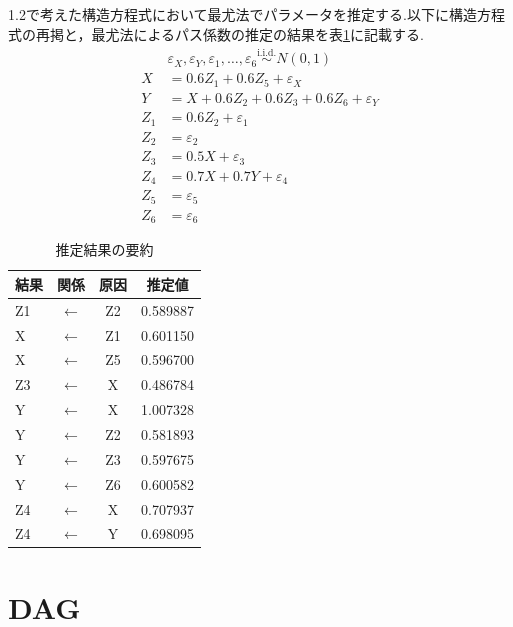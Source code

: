 \documentclass[uplatex, dvipdfmx]{jsarticle}
\begin{document}
\begin{exm}{}
  1.2で考えた構造方程式において最尤法でパラメータを推定する.以下に構造方程式の再掲と，最尤法によるパス係数の推定の結果を表\ref{tab:results_2}に記載する.
  \begin{align}
      &\varepsilon_X, \varepsilon_Y, \varepsilon_1, \dots, \varepsilon_6 \overset{\text{i.i.d.}}{\sim} N(0, 1) \\
      X  &= 0.6Z_1 + 0.6Z_5 + \varepsilon_X \\
      Y  &= X + 0.6Z_2 + 0.6Z_3 + 0.6Z_6 + \varepsilon_Y \\
      Z_1 &= 0.6Z_2 + \varepsilon_1 \\
      Z_2 &= \varepsilon_2 \\
      Z_3 &= 0.5X + \varepsilon_3 \\
      Z_4 &= 0.7X + 0.7Y + \varepsilon_4 \\
      Z_5 &= \varepsilon_5 \\
      Z_6 &= \varepsilon_6 
  \end{align}

  \begin{table}[H]
    \centering
    \caption{推定結果の要約}
    \label{tab:results_2}
    \begin{tabular}{lccc}
      \hline
      結果 & 関係 & 原因 & 推定値 \\ \hline
      Z1 & $\leftarrow$ & Z2 & 0.589887 \\
      X & $\leftarrow$ & Z1 & 0.601150 \\
      X & $\leftarrow$ & Z5 & 0.596700 \\
      Z3 & $\leftarrow$ & X & 0.486784 \\
      Y & $\leftarrow$ & X & 1.007328 \\
      Y & $\leftarrow$ & Z2 & 0.581893 \\
      Y & $\leftarrow$ & Z3 & 0.597675 \\
      Y & $\leftarrow$ & Z6 & 0.600582 \\
      Z4 & $\leftarrow$ & X & 0.707937 \\
      Z4 & $\leftarrow$ & Y & 0.698095 \\ \hline
    \end{tabular}
  \end{table}
\end{exm}

\newpage

\section{DAG}
\end{document}
